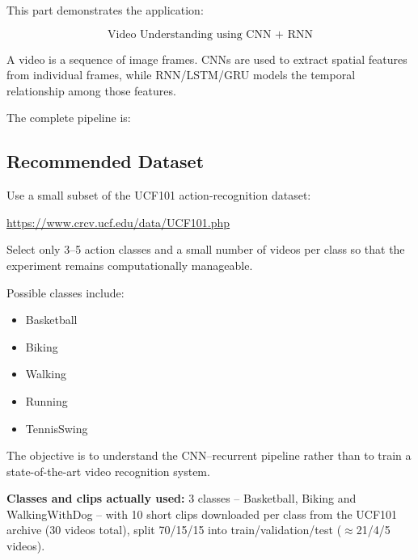\documentclass[10pt]{article}
\begin{document}
This part demonstrates the application:

\[
\boxed{\text{Video Understanding using CNN + RNN}}
\]

A video is a sequence of image frames. CNNs are used to extract spatial
features from individual frames, while RNN/LSTM/GRU models the temporal
relationship among those features.

The complete pipeline is:

\begin{center}
\end{center}

\subsection*{Recommended Dataset}

Use a small subset of the UCF101 action-recognition dataset:

\url{https://www.crcv.ucf.edu/data/UCF101.php}

Select only 3--5 action classes and a small number of videos per class so that
the experiment remains computationally manageable.

Possible classes include:

\begin{itemize}
\item Basketball
\item Biking
\item Walking
\item Running
\item TennisSwing
\end{itemize}

The objective is to understand the CNN--recurrent pipeline rather than to
train a state-of-the-art video recognition system.

\textbf{Classes and clips actually used:} 3 classes -- Basketball, Biking and
WalkingWithDog -- with 10 short clips downloaded per class from the UCF101
archive (30 videos total), split 70/15/15 into train/validation/test
($\approx$21/4/5 videos).
\end{document}
